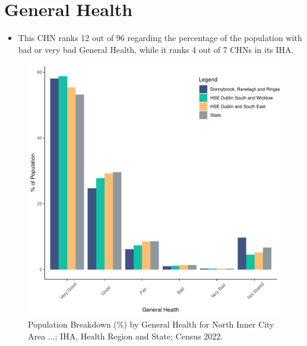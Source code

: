 \documentclass{article}
\begin{document}
\pagebreak

\section{General Health}\label{sect:GenHealth}
\begin{itemize}
\item  This CHN ranks  12 out of 96 regarding the percentage of the population with bad or very bad General Health, while it ranks   4 out of 7 CHNs in its IHA.
\end{itemize}
\begin{figure}[h]
	\centering
	\includegraphics[width = 150mm]{../figures/GenED.pdf}
	\caption{Population Breakdown (\%) by General Health for North Inner City Area ...; IHA, Health Region and State;  Census 2022.}
	\label{fig:2ae19629-1a6a-13a3-e055-000000000001}
	\end{figure}
\end{document}
